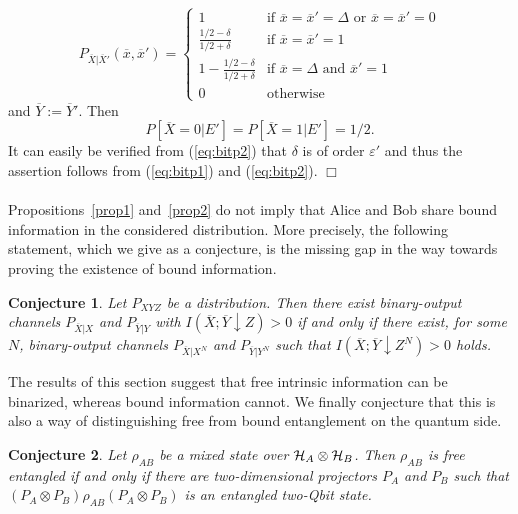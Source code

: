 \documentclass{article}
\newtheorem{con}{Conjecture}
\newcommand{\HA}{{\cal H}_{{A}}}
\newcommand{\HB}{{\cal H}_{{B}}}
\newcommand{\pe}{\hspace*{\fill} $\Box$\\ \ \\}
\newcommand{\OX}{\overline{X}}
\newcommand{\OY}{\overline{Y}}
\begin{document}
  \begin{equation}
    P_{\overline{X}|\overline{X}'} (\overline{x}, \overline{x}') = 
    \begin{cases}
      1         & \text{if $\overline{x} = \overline{x}' = \Delta$ 
                    or $\overline{x}=\overline{x}'=0$} \\
      \frac{1/2-\delta}{1/2+\delta} 
                & \text{if $\overline{x} = \overline{x}' = 1$} \\
      1 - \frac{1/2-\delta}{1/2+\delta} 
                & \text{if $\overline{x} = \Delta$ and $\overline{x}' = 1$} \\
      0         & \text{otherwise}
    \end{cases}
  \end{equation}
  and $\overline{Y} := \overline{Y}'$. Then
  \begin{equation}
     P[\overline{X} = 0 | E'] = P[\overline{X} = 1 | E'] = 1/2.
  \end{equation}
  It can easily be verified from (\ref{eq:bitp2}) that $\delta$ is of
  order $\varepsilon'$ and thus the assertion follows
  from (\ref{eq:bitp1}) and (\ref{eq:bitp2}).
\pe
Propositions~\ref{prop1} and~\ref{prop2} 
do not  imply that Alice and Bob share 
bound information in the considered distribution. More precisely, 
the following statement, which we give as a conjecture, is the missing 
gap in the way towards proving the existence  of bound information.

\begin{con}\label{gapcon}
Let $P_{XYZ}$ be a distribution. Then there exist binary-output 
channels $P_{\OX|X}$ and $P_{\OY|Y}$ with $I(\OX;\OY\downarrow Z)>0$
if and only if there exist, for some $N$, binary-output channels 
$P_{\overline{X}|X^N}$ and $P_{\overline{Y}|Y^N}$ such that 
$I(\overline{X};\overline{Y}\downarrow Z^N)>0$ holds.
\end{con}


The results of this section suggest that free intrinsic information
can be binarized, whereas bound information cannot. We finally conjecture
that this is also a way of distinguishing free from bound entanglement 
on the quantum side.

\begin{con}
Let $\rho_{AB}$ be a mixed state over $\HA\otimes \HB$. Then $\rho_{AB}$
 is free entangled if and only if 
there are two-dimensional projectors $P_A$ and $P_B$ such that 
$(P_A\otimes P_B)\rho_{AB} (P_A\otimes P_B)$ 
is an entangled two-Qbit state. 
\end{con}
\end{document}
